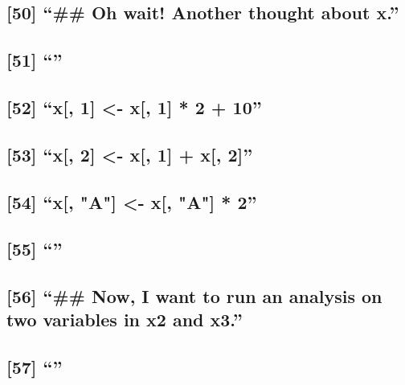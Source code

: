 \documentclass[]{article}
\begin{document}
\subsection{\texorpdfstring{{[}50{]} ``\#\# Oh wait! Another thought
about
x.''}{{[}50{]} \#\# Oh wait! Another thought about x.}}\label{oh-wait-another-thought-about-x.}

\subsection{\texorpdfstring{{[}51{]} ``''}{{[}51{]} }}\label{section-13}

\subsection{\texorpdfstring{{[}52{]} ``x{[}, 1{]} \textless{}- x{[},
1{]} * 2 +
10''}{{[}52{]} x{[}, 1{]} \textless{}- x{[}, 1{]} * 2 + 10}}\label{x-1---x-1-2-10}

\subsection{\texorpdfstring{{[}53{]} ``x{[}, 2{]} \textless{}- x{[},
1{]} + x{[},
2{]}''}{{[}53{]} x{[}, 2{]} \textless{}- x{[}, 1{]} + x{[}, 2{]}}}\label{x-2---x-1-x-2}

\subsection{\texorpdfstring{{[}54{]} ``x{[}, "A"{]} \textless{}- x{[},
"A"{]} *
2''}{{[}54{]} x{[}, "A"{]} \textless{}- x{[}, "A"{]} * 2}}\label{x-a---x-a-2}

\subsection{\texorpdfstring{{[}55{]} ``''}{{[}55{]} }}\label{section-14}

\subsection{\texorpdfstring{{[}56{]} ``\#\# Now, I want to run an
analysis on two variables in x2 and
x3.''}{{[}56{]} \#\# Now, I want to run an analysis on two variables in x2 and x3.}}\label{now-i-want-to-run-an-analysis-on-two-variables-in-x2-and-x3.}

\subsection{\texorpdfstring{{[}57{]} ``''}{{[}57{]} }}\label{section-15}
\end{document}
